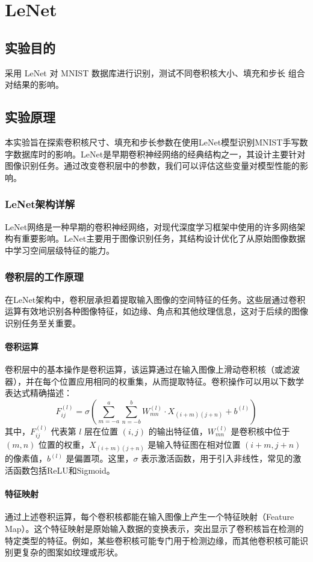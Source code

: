 \documentclass[a4paper,12pt]{article}
\begin{document}
\newpage
\section{LeNet}
\subsection{实验目的}
采用 LeNet 对 MNIST 数据库进行识别，测试不同卷积核大小、填充和步长
组合对结果的影响。
\subsection{实验原理}
本实验旨在探索卷积核尺寸、填充和步长参数在使用LeNet模型识别MNIST手写数字数据库时的影响。LeNet是早期卷积神经网络的经典结构之一，其设计主要针对图像识别任务。通过改变卷积层中的参数，我们可以评估这些变量对模型性能的影响。

\subsubsection{LeNet架构详解}
LeNet网络是一种早期的卷积神经网络，对现代深度学习框架中使用的许多网络架构有重要影响。LeNet主要用于图像识别任务，其结构设计优化了从原始图像数据中学习空间层级特征的能力。

\subsubsection*{卷积层的工作原理}
在LeNet架构中，卷积层承担着提取输入图像的空间特征的任务。这些层通过卷积运算有效地识别各种图像特征，如边缘、角点和其他纹理信息，这对于后续的图像识别任务至关重要。

\paragraph{卷积运算}
卷积层中的基本操作是卷积运算，该运算通过在输入图像上滑动卷积核（或滤波器），并在每个位置应用相同的权重集，从而提取特征。卷积操作可以用以下数学表达式精确描述：
\[
F_{ij}^{(l)} = \sigma\left(\sum_{m=-a}^{a}\sum_{n=-b}^{b} W_{mn}^{(l)} \cdot X_{(i+m)(j+n)} + b^{(l)}\right)
\]
其中，\( F_{ij}^{(l)} \) 代表第 \( l \) 层在位置 \( (i, j) \) 的输出特征值，\( W_{mn}^{(l)} \) 是卷积核中位于 \( (m, n) \) 位置的权重，\( X_{(i+m)(j+n)} \) 是输入特征图在相对位置 \( (i+m, j+n) \) 的像素值，\( b^{(l)} \) 是偏置项。这里，\( \sigma \) 表示激活函数，用于引入非线性，常见的激活函数包括ReLU和Sigmoid。

\paragraph{特征映射}
通过上述卷积运算，每个卷积核都能在输入图像上产生一个特征映射（Feature Map）。这个特征映射是原始输入数据的变换表示，突出显示了卷积核旨在检测的特定类型的特征。例如，某些卷积核可能专门用于检测边缘，而其他卷积核可能识别更复杂的图案如纹理或形状。
\end{document}
